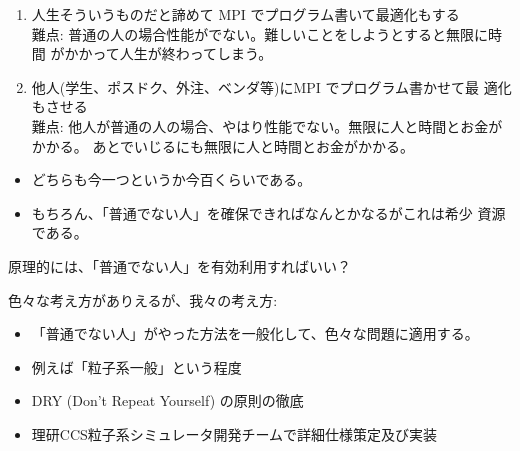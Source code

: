\documentclass[12pt,dvipdfmx]{article}
\begin{document}

\begin{enumerate}

\item 人生そういうものだと諦めて MPI でプログラム書いて最適化もする\\
難点: 普通の人の場合性能がでない。難しいことをしようとすると無限に時間
がかかって人生が終わってしまう。


\item 他人(学生、ポスドク、外注、ベンダ等)にMPI でプログラム書かせて最
適化もさせる\\
難点: 他人が普通の人の場合、やはり性能でない。無限に人と時間とお金がかかる。
あとでいじるにも無限に人と時間とお金がかかる。

\end{enumerate}

\begin{itemize}
\item どちらも今一つというか今百くらいである。

\item もちろん、「普通でない人」を確保できればなんとかなるがこれは希少
資源である。

\end{itemize}


\begin{shadebox}
原理的には、「普通でない人」を有効利用すればいい？
\end{shadebox}










色々な考え方がありえるが、我々の考え方:

\begin{itemize}

\item 「普通でない人」がやった方法を一般化して、色々な問題に適用する。
\item 例えば「粒子系一般」という程度
\item DRY (Don't Repeat Yourself) の原則の徹底
\item 理研CCS粒子系シミュレータ開発チームで詳細仕様策定及び実装

\end{itemize}
\end{document}
